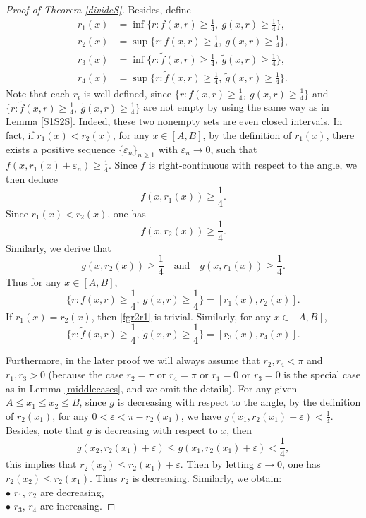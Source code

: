 \documentclass[oneside,english,a4wide]{amsart}
\numberwithin{equation}{section}
\numberwithin{figure}{section}
\theoremstyle{plain}
\theoremstyle{plain}
\theoremstyle{definition}
\theoremstyle{plain}
\theoremstyle{remark}
\theoremstyle{definition}
\theoremstyle{remark}
\theoremstyle{definition}
\newcommand{\8}{\infty}
\begin{document}
\begin{proof}[Proof of Theorem \ref{divideS}]
	
	Besides, define 
	\begin{equation*}
		\begin{aligned}
			r_1(x){}&=\inf\Big\{r:f(x,r)\ge \frac{1}{4}, \ g(x,r)\ge \frac{1}{4}\Big\},\\
			r_2(x)&=\sup\Big\{r:f(x,r)\ge \frac{1}{4}, \ g(x,r)\ge \frac{1}{4}\Big\},\\
			r_3(x)&=\inf\Big\{r:\tilde{f}(x,r)\ge \frac{1}{4}, \  \tilde{g}(x,r)\ge \frac{1}{4}\Big\},\\
			r_4(x)&=\sup\Big\{r:\tilde{f}(x,r)\ge \frac{1}{4}, \  \tilde{g}(x,r)\ge \frac{1}{4}\Big\}.
		\end{aligned}
	\end{equation*}
Note that each $r_i$ is well-defined, since $\Big\{r:f(x,r)\ge \frac{1}{4}, \ g(x,r)\ge \frac{1}{4}\Big\}$ and $\Big\{r:\tilde{f}(x,r)\ge \frac{1}{4}, \  \tilde{g}(x,r)\ge \frac{1}{4}\Big\}$ are not empty by using the same way as in Lemma \ref{S1S2S}. Indeed, these two nonempty sets are even closed intervals. In fact, if $r_1(x)<r_2(x)$, for any $x\in [A,B]$, by the definition of $r_1(x)$, there exists a positive sequence $\{\varepsilon_n\}_{n\ge 1}$ with $\varepsilon_n\to 0$, such that $f(x,r_1(x)+\varepsilon_n)\ge \frac{1}{4}$. Since $f$ is right-continuous with respect to the angle, we then deduce $$f(x,r_1(x))\ge \frac{1}{4}.$$
	Since $r_1(x)< r_2(x)$, one has $$f(x,r_2(x))\ge \frac{1}{4}.$$
	Similarly, we derive that 
	$$g(x,r_2(x))\ge \frac{1}{4} \quad \text{and} \quad g(x,r_1(x))\ge \frac{1}{4}.$$
	Thus for any $x\in [A,B]$,
	\begin{equation}\label{fgr2r1}
		\Big\{r:f(x,r)\ge \frac{1}{4}, \ g(x,r)\ge \frac{1}{4}\Big\}=[r_1(x),r_2(x)].
	\end{equation}
    If $r_1(x)=r_2(x)$, then \eqref{fgr2r1} is trivial.
	Similarly, for any $x\in [A,B]$,
	\begin{equation}\label{fgr3r4}
		\Big\{r:\tilde{f}(x,r)\ge \frac{1}{4}, \ \tilde{g}(x,r)\ge \frac{1}{4}\Big\}=[r_3(x),r_4(x)].
	\end{equation}
	
	
	 Furthermore, in the later proof we will always assume that $r_2,r_4< \pi$ and $r_1,r_3>0$ (because the case $r_2=\pi$ or $r_4=\pi$ or $r_1=0$ or $r_3=0$ is the special case as in Lemma \ref{middlecases}, and we omit the details).
	For any given $A\le x_1\le x_2\le B$, since $g$ is decreasing with respect to the angle, by the definition of $r_2(x_1)$, for any $0<\varepsilon<\pi-r_2(x_1)$, we have $g(x_1,r_2(x_1)+\varepsilon)<\frac{1}{4}$. Besides, note that $g$ is decreasing with respect to $x$, then
	\begin{equation*}
		g(x_2,r_2(x_1)+\varepsilon)\le g(x_1,r_2(x_1)+\varepsilon)<\frac{1}{4},
	\end{equation*}
	this implies that $r_2(x_2)\le r_2(x_1)+\varepsilon$. Then by letting $\varepsilon\to 0$, one has $r_2(x_2)\le r_2(x_1)$. Thus $r_2$ is decreasing. Similarly, we obtain:\\
	$\bullet$ $r_1$, $r_2$ are decreasing,\\
	$\bullet$ $r_3$, $r_4$ are increasing.
	

\end{proof}
\end{document}
